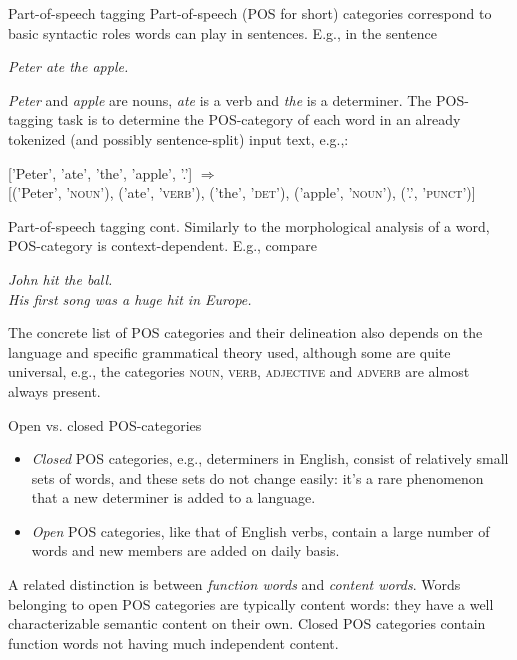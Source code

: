 \documentclass[style=upen, size=14pt]{powerdot}
\newcommand{\gold}{\color{arany}}
\begin{document}
\begin{slide}[toc=POS tagging]{Part-of-speech tagging}
  Part-of-speech (POS for short) categories correspond to basic syntactic roles
  words can play in sentences. E.g., in the sentence\bigskip

  \emph{Peter ate the apple.}\bigskip

  \emph{Peter} and \emph{apple} are nouns, \emph{ate} is a verb and \emph{the}
  is a determiner. The POS-tagging task is to determine the POS-category of each
  word in an already tokenized (and possibly sentence-split) input text,
  e.g.,:\bigskip

  ['Peter', 'ate', 'the', 'apple', '.'] $\Rightarrow$ \\
  
  [('Peter', \textsc{'noun'}), ('ate', \textsc{'verb'}), ('the',
  \textsc{'det'}), ('apple', \textsc{'noun'}), ('.', \textsc{'punct'})]
\end{slide}

\begin{slide}[toc=]{Part-of-speech tagging cont.}
  Similarly to the morphological analysis of a word, POS-category is
  context-dependent. E.g., compare\bigskip

  \emph{John {\gold hit} the ball.}\\
  \emph{His first song was a huge {\gold hit} in Europe.}\bigskip

  The concrete list of POS categories and their delineation also depends on the
  language and specific grammatical theory used, although some are quite
  universal, e.g., the categories \textsc{noun}, \textsc{verb},
  \textsc{adjective} and \textsc{adverb} are almost always present.
\end{slide}

\begin{slide}[toc=]{Open vs. closed POS-categories}
  \begin{itemize}
  \item \emph{\gold Closed} POS categories, e.g., determiners in English, consist of
    relatively small sets of words, and these sets do not change easily: it's a
    rare phenomenon that a new determiner is added to a language.
  \item \emph{\gold Open} POS categories, like that of English verbs, contain a
    large number of words and new members are added on daily basis.
  \end{itemize}
  A related distinction is between \emph{function words} and \emph{content
    words}. Words belonging to open POS categories are typically content words:
  they have a well characterizable semantic content on their own. Closed POS
  categories contain function words not having much independent content.
\end{slide}
\end{document}
